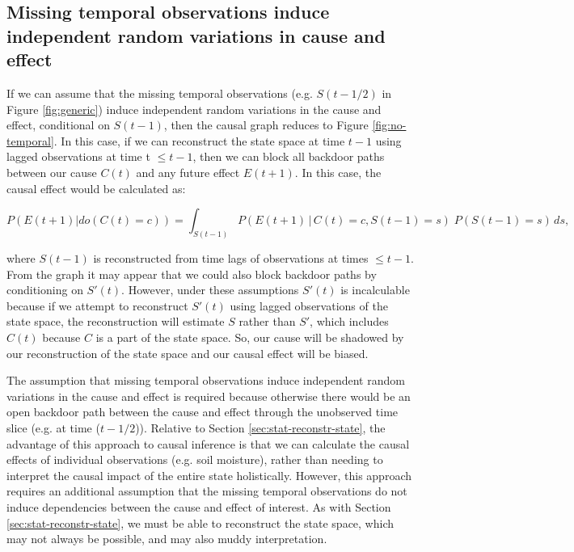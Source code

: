 \documentclass[12pt]{article}
\begin{document}
\subsection{Missing temporal observations induce independent random
  variations in cause and effect}
\label{sec:miss-temp-observ}

If we can assume that the missing temporal observations
(e.g. $S(t-1/2)$ in Figure \ref{fig:generic}) induce independent
random variations in the cause and effect, conditional on $S(t-1)$,
then the causal graph reduces to Figure \ref{fig:no-temporal}. In this
case, if we can reconstruct the state space at time $t-1$ using lagged
observations at time t $\leq t-1$, then we can block all backdoor
paths between our cause $C(t)$ and any future effect $E(t+1)$. In this
case, the causal effect would be calculated as:

\begin{equation}
  P(E(t+1)| do(C(t)=c)) = \int_{S(t-1)} P(E(t+1) \, | \, C(t)=c,
  S(t-1) = s
  )\; P(S(t-1)=s) \, d s,
\end{equation}

where $S(t-1)$ is reconstructed from time lags of observations at
times $\leq t-1$. From the graph it may appear that we could also
block backdoor paths by conditioning on $S'(t)$. However, under these
assumptions $S'(t)$ is incalculable because if we attempt to
reconstruct $S'(t)$ using lagged observations of the state space, the
reconstruction will estimate $S$ rather than $S'$, which includes
$C(t)$ because $C$ is a part of the state space. So, our cause will be
shadowed by our reconstruction of the state space and our causal
effect will be biased.

The assumption that missing temporal observations induce independent
random variations in the cause and effect is required because
otherwise there would be an open backdoor path between the cause and
effect through the unobserved time slice (e.g. at time
($t-1/2$)). Relative to Section \ref{sec:stat-reconstr-state}, the
advantage of this approach to causal inference is that we can
calculate the causal effects of individual observations (e.g. soil
moisture), rather than needing to interpret the causal impact of the
entire state holistically. However, this approach requires an
additional assumption that the missing temporal observations do not
induce dependencies between the cause and effect of interest. As with
Section \ref{sec:stat-reconstr-state}, we must be able to reconstruct
the state space, which may not always be possible, and may also muddy
interpretation.
\end{document}
